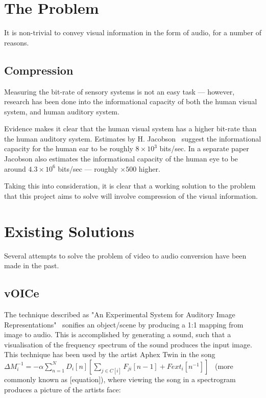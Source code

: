 \section{The Problem}
It is non-trivial to convey visual information in the form of audio, for a number of reasons.

\subsection{Compression}
Measuring the bit-rate of sensory systems is not an easy task --- however, research has been done into the informational capacity of both the human visual system, and human auditory system.

Evidence makes it clear that the human visual system has a higher bit-rate than the human auditory system. Estimates by H. Jacobson~\cite{jacobson1950informational} suggest the informational capacity for the human ear to be roughly $8\times10^3$ bits/sec. In a separate paper~\cite{jacobson1951informational} Jacobson also estimates the informational capacity of the human eye to be around $4.3\times10^6$ bits/sec --- roughly $\times500$ higher. 

Taking this into consideration, it is clear that a working solution to the problem that this project aims to solve will involve compression of the visual information. 

\section{Existing Solutions}
Several attempts to solve the problem of video to audio conversion have been made in the past.

\subsection{vOICe}
The technique described as "An Experimental System for Auditory Image Representations"~\cite{vOICe} sonifies an object/scene by producing a 1:1 mapping from image to audio. This is accomplished by generating a sound, such that a visualisation of the frequency spectrum of the sound produces the input image. This technique has been used by the artist Aphex Twin in the song $\Delta M_i^{-1} = - \alpha \sum_{n=1}^N D_i \left[ n \right] \left[ \sum_{j \in C \left[ i \right]}^{} F_{ji} \left[ n -1 \right] + Fext_i \left[ n^{-1} \right] \right]$~\cite{aphex-equation} (more commonly known as [equation]), where viewing the song in a spectrogram produces a picture of the artists face:

